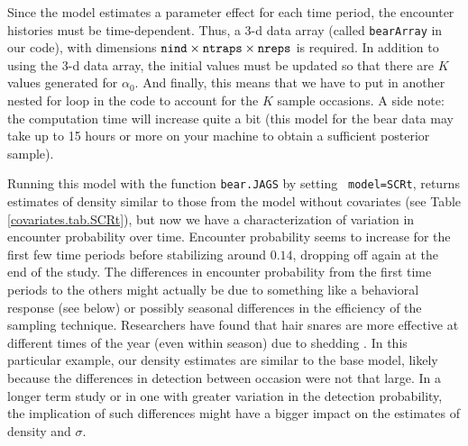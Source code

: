 Since the model estimates a parameter effect for each time period, the
encounter histories must be time-dependent.  Thus, a 3-d data array
(called \mbox{\tt bearArray} in our code), with dimensions $\mbox{\tt
  nind} \times \mbox{\tt ntraps} \times \mbox{\tt nreps}$ is
required. In addition to using the 3-d data array, the initial values
must be updated so that there are $K$ values generated for $\alpha_0$.
And finally, this means that we have to put in another nested for loop
in the code to account for the $K$ sample occasions.  A side note: the
computation time will increase quite a bit (this model for the bear
data may take up to 15 hours or more on your machine to obtain a
sufficient posterior sample).

Running this model with the function {\tt bear.JAGS} by setting {\tt
  model=SCRt}, returns estimates of density similar to those from the model 
  without covariates (see Table \ref{covariates.tab.SCRt}), but
now we have a characterization of variation in encounter probability
over time.  Encounter probability seems to increase for the first few
time periods before stabilizing around $0.14$, dropping off again at
the end of the study.  The differences in encounter probability from
the first time periods to the others might actually be due to
something like a behavioral response (see below) or possibly seasonal
differences in the efficiency of the sampling technique.  Researchers
have found that hair snares are more effective at different times of
the year (even within season) due to shedding
\citep{wegan_etal:2012}.  In this particular example, our density
estimates are similar to the base model, likely because the
differences in detection between occasion were not that large.  In a
longer term study or in one with greater variation in the detection
probability, the implication of such differences might have a bigger
impact on the estimates of density and $\sigma$.

